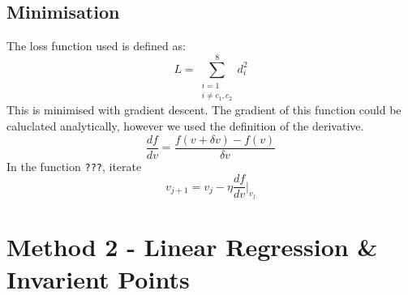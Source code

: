 \documentclass[11pt]{article}
\begin{document}
\subsection{Minimisation}
\label{sec:minimisation}
The loss function used is defined as:
\begin{equation}
    L = \sum\limits_{\substack{i=1 \\ i\neq c_1, c_2}}^{8} d_i^2
    \label{eq:loss}
\end{equation}
This is minimised with gradient descent. The gradient of this function could be caluclated analytically, however we used the definition of the derivative.
\begin{equation}
    \frac{df}{dv} = \frac{f(v + \delta v) - f(v)}{\delta v}
    \label{eq:grad}
\end{equation}
In the function \texttt{???}, iterate
\begin{equation}
    v_{j+1} = v_j - \eta \frac{df}{dv}\Bigr|_{v_j}
    \label{eq:iter}
\end{equation}


\section{Method 2 - Linear Regression \& Invarient Points}
\label{sec:linreg}
\end{document}
